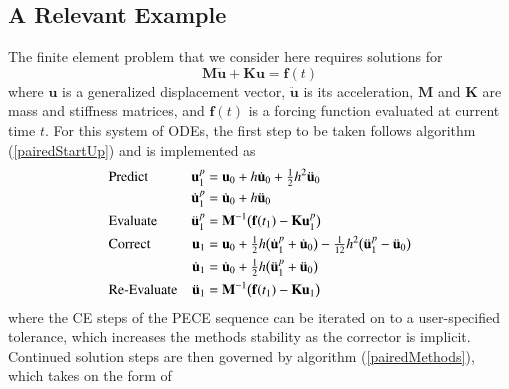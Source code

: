 \subsection{A Relevant Example}
\label{sec:solve2ndOrderODE}

The finite element problem that we consider here requires solutions for
\begin{displaymath}
    \mathbf{M} \ddot{\mathbf{u}} + \mathbf{K}\mathbf{u} = \mathbf{f}(t)
\end{displaymath}
where $\mathbf{u}$ is a generalized displacement vector, $\ddot{\mathbf{u}}$ is its acceleration, $\mathbf{M}$ and $\mathbf{K}$ are mass and stiffness matrices, and $\mathbf{f}(t)$ is a forcing function evaluated at current time $t$.  For this system of ODEs, the first step to be taken follows algorithm (\ref{pairedStartUp}) and is implemented as
\begin{subequations}
    \notag
    \begin{align}
    \mbox{} & \text{Predict} & 
    \mathbf{u}_1^p & = \mathbf{u}_0 + h \dot{\mathbf{u}}_0 +
    \tfrac{1}{2} h^2 \ddot{\mathbf{u}}_0 \\
    \mbox{} & &
    \dot{\mathbf{u}}^p_1 & = \dot{\mathbf{u}}_0 + h \ddot{\mathbf{u}}_0 \\
    \mbox{} & \text{Evaluate} &
    \ddot{\mathbf{u}}^p_1 & = \mathbf{M}^{-1} \bigl( \mathbf{f}(t_{1} ) - 
    \mathbf{K} \mathbf{u}_1^p \bigr) \\
    \mbox{} & \text{Correct} &
    \mathbf{u}_1 & = \mathbf{u}_0 + \tfrac{1}{2} h 
    \bigl( \dot{\mathbf{u}}^p_1 + \dot{\mathbf{u}}_0 \bigr) -
    \tfrac{1}{12} h^2 \bigl( \ddot{\mathbf{u}}^p_1 - \ddot{\mathbf{u}}_0 \bigr) \\
    \mbox{} & &
    \dot{\mathbf{u}}_1 & = \dot{\mathbf{u}}_0 + \tfrac{1}{2} h 
    \bigl( \ddot{\mathbf{u}}_1^p + \ddot{\mathbf{u}}_0 \bigr) \\
    \mbox{} & \text{Re-Evaluate} &
    \ddot{\mathbf{u}}_1 & = \mathbf{M}^{-1} \bigl( \mathbf{f}(t_1 ) - 
    \mathbf{K} \mathbf{u}_1 \bigr)
    \end{align}
\end{subequations}
where the CE steps of the PECE sequence can be iterated on to a user-specified tolerance, which increases the methods stability as the corrector is implicit.  Continued solution steps are then governed by algorithm (\ref{pairedMethods}), which takes on the form of
